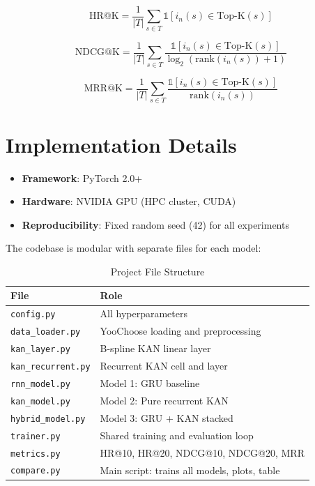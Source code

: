 \documentclass[12pt,a4paper]{report}
\begin{document}
\begin{equation}
\text{HR@K} = \frac{1}{|T|} \sum_{s \in T} \mathbb{1}[i_n(s) \in \text{Top-K}(s)]
\end{equation}

\begin{equation}
\text{NDCG@K} = \frac{1}{|T|} \sum_{s \in T}
  \frac{\mathbb{1}[i_n(s) \in \text{Top-K}(s)]}{\log_2(\text{rank}(i_n(s)) + 1)}
\end{equation}

\begin{equation}
\text{MRR@K} = \frac{1}{|T|} \sum_{s \in T}
  \frac{\mathbb{1}[i_n(s) \in \text{Top-K}(s)]}{\text{rank}(i_n(s))}
\end{equation}

\section{Implementation Details}

\begin{itemize}
    \item \textbf{Framework}: PyTorch 2.0+
    \item \textbf{Hardware}: NVIDIA GPU (HPC cluster, CUDA)
    \item \textbf{Reproducibility}: Fixed random seed (42) for all experiments
\end{itemize}

The codebase is modular with separate files for each model:

\begin{table}[H]
\centering
\caption{Project File Structure}
\begin{tabular}{ll}
\toprule
\textbf{File}              & \textbf{Role}                                  \\
\midrule
\texttt{config.py}         & All hyperparameters                            \\
\texttt{data\_loader.py}   & YooChoose loading and preprocessing            \\
\texttt{kan\_layer.py}     & B-spline KAN linear layer                      \\
\texttt{kan\_recurrent.py} & Recurrent KAN cell and layer                   \\
\texttt{rnn\_model.py}     & Model 1: GRU baseline                          \\
\texttt{kan\_model.py}     & Model 2: Pure recurrent KAN                    \\
\texttt{hybrid\_model.py}  & Model 3: GRU + KAN stacked                     \\
\texttt{trainer.py}        & Shared training and evaluation loop            \\
\texttt{metrics.py}        & HR@10, HR@20, NDCG@10, NDCG@20, MRR           \\
\texttt{compare.py}        & Main script: trains all models, plots, table   \\
\bottomrule
\end{tabular}
\label{tab:files}
\end{table}
\end{document}
